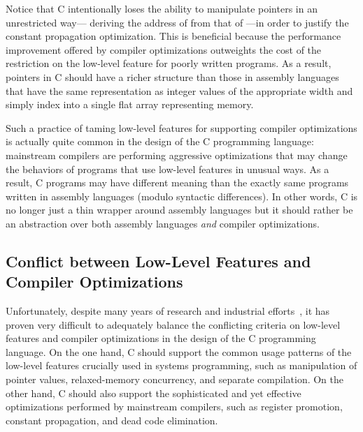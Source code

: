 Notice that C intentionally loses the ability to manipulate pointers in an unrestricted way---\eg{}
deriving the address of  from that of ---in order to justify the constant
propagation optimization.  This is beneficial because the performance improvement offered by
compiler optimizations outweights the cost of the restriction on the low-level feature for poorly
written programs.  As a result, pointers in C should have a richer structure than those in assembly
languages that have the same representation as integer values of the appropriate width and simply
index into a single flat array representing memory.

Such a practice of taming low-level features for supporting compiler optimizations is actually quite
common in the design of the C programming language: mainstream compilers are performing aggressive
optimizations that may change the behaviors of programs that use low-level features in unusual ways.
As a result, C programs may have different meaning than the exactly same programs written in
assembly languages (modulo syntactic differences).  In other words, C is no longer just a thin
wrapper around assembly languages but it should rather be an abstraction over both assembly
languages \emph{and} compiler optimizations.



\subsection{Conflict between Low-Level Features and Compiler Optimizations}
\label{sec:introduction:problem}

Unfortunately, despite many years of research and industrial efforts~\cite{c18}, it has proven very
difficult to adequately balance the conflicting criteria on low-level features and compiler
optimizations in the design of the C programming language.  On the one hand, C should support the
common usage patterns of the low-level features crucially used in systems programming, such as
manipulation of pointer values, relaxed-memory concurrency, and separate compilation.  On the other
hand, C should also support the sophisticated and yet effective optimizations performed by
mainstream compilers, such as register promotion, constant propagation, and dead code elimination.


